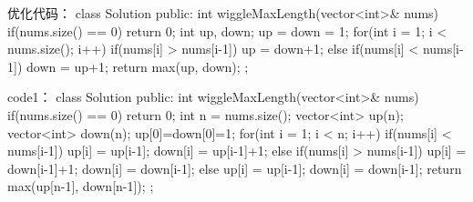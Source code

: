 优化代码：
class Solution {
public:
    int wiggleMaxLength(vector<int>& nums) {
        if(nums.size() == 0) return 0;
        int up, down;
        up = down = 1;
        for(int i = 1; i < nums.size(); i++)
        {
            if(nums[i] > nums[i-1]) up = down+1;
            else if(nums[i] < nums[i-1]) down = up+1;
        }
        return max(up, down);
    }
};





























code1：
class Solution {
public:
    int wiggleMaxLength(vector<int>& nums) {
        if(nums.size() == 0) return 0;
        int n = nums.size();
        vector<int> up(n);
        vector<int> down(n);
        up[0]=down[0]=1;
        for(int i = 1; i < n; i++)
        {
            if(nums[i] < nums[i-1])
            {
                up[i] = up[i-1];
                down[i] = up[i-1]+1;
            }
            else if(nums[i] > nums[i-1])
            {
                up[i] = down[i-1]+1;
                down[i] = down[i-1];
            }
            else
            {
                up[i] = up[i-1];
                down[i] = down[i-1];
            }
        }
        return max(up[n-1], down[n-1]);
    }
};